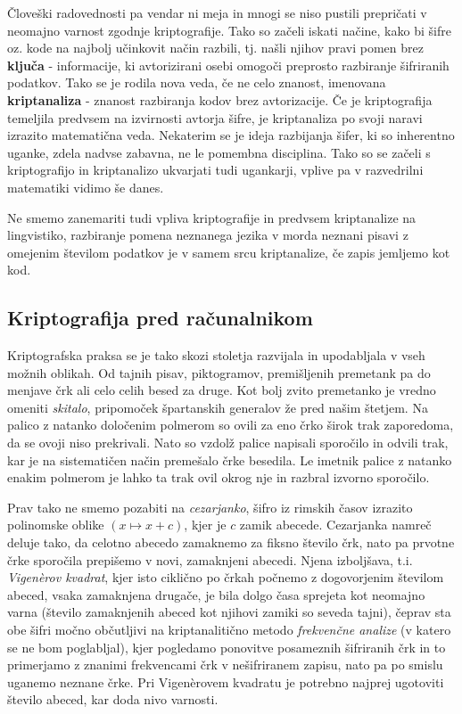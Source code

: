 \documentclass[a4paper, 12pt]{article} %
\begin{document}
\newline
\newline
Človeški radovednosti pa vendar ni meja in mnogi se niso pustili prepričati v neomajno varnost zgodnje kriptografije. Tako so začeli iskati načine, kako bi šifre oz. kode na najbolj učinkovit način razbili, tj. našli njihov pravi pomen brez \textbf{ključa} - informacije, ki avtorizirani osebi omogoči preprosto razbiranje šifriranih podatkov. Tako se je rodila nova veda, če ne celo znanost, imenovana \textbf{kriptanaliza} - znanost razbiranja kodov brez avtorizacije. Če je kriptografija temeljila predvsem na izvirnosti avtorja šifre, je kriptanaliza po svoji naravi izrazito matematična veda. Nekaterim se je ideja razbijanja šifer, ki so inherentno uganke, zdela nadvse zabavna, ne le pomembna disciplina. Tako so se začeli s kriptografijo in kriptanalizo ukvarjati tudi ugankarji, vplive pa v razvedrilni matematiki vidimo še danes.

Ne smemo zanemariti tudi vpliva kriptografije in predvsem kriptanalize na lingvistiko, razbiranje pomena neznanega jezika v morda neznani pisavi z omejenim številom podatkov je v samem srcu kriptanalize, če zapis jemljemo kot kod.

\subsection{Kriptografija pred računalnikom}

Kriptografska praksa se je tako skozi stoletja razvijala in upodabljala v vseh možnih oblikah. Od tajnih pisav, piktogramov, premišljenih premetank pa do menjave črk ali celo celih besed za druge. Kot bolj zvito premetanko je vredno omeniti \emph{skitalo}, pripomoček špartanskih generalov že pred našim štetjem. Na palico z natanko določenim polmerom so ovili za eno črko širok trak zaporedoma, da se ovoji niso prekrivali. Nato so vzdolž palice napisali sporočilo in odvili trak, kar je na sistematičen način premešalo črke besedila. Le imetnik palice z natanko enakim polmerom je lahko ta trak ovil okrog nje in razbral izvorno sporočilo.

Prav tako ne smemo pozabiti na \emph{cezarjanko}, šifro iz rimskih časov izrazito polinomske oblike $(x \mapsto x + c)$, kjer je $c$ zamik abecede. Cezarjanka namreč deluje tako, da celotno abecedo zamaknemo za fiksno število črk, nato pa prvotne črke sporočila prepišemo v novi, zamaknjeni abecedi. Njena izboljšava, t.i. \emph{Vigen\`{e}rov kvadrat}, kjer isto ciklično po črkah počnemo z dogovorjenim številom abeced, vsaka zamaknjena drugače, je bila dolgo časa sprejeta kot neomajno varna (število zamaknjenih abeced kot njihovi zamiki so seveda tajni), čeprav sta obe šifri močno občutljivi na kriptanalitično metodo \emph{frekvenčne analize} (v katero se ne bom poglabljal), kjer pogledamo ponovitve posameznih šifriranih črk in to primerjamo z znanimi frekvencami črk v nešifriranem zapisu, nato pa po smislu uganemo neznane črke. Pri Vigen\`{e}rovem kvadratu je potrebno najprej ugotoviti število abeced, kar doda nivo varnosti.
\end{document}
